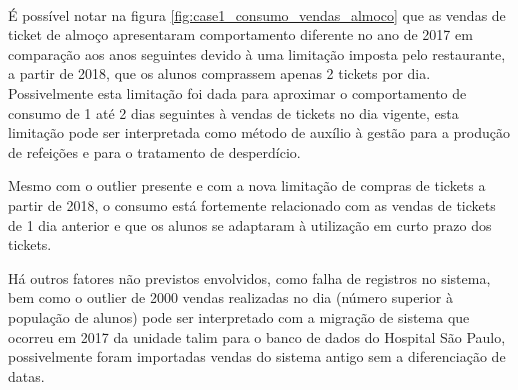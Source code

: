 \documentclass[	12pt, Times, openright, twoside, a4paper, english, brazil]{abntex2}
\begin{document}
        	      \paragraph*{}É possível notar na figura \ref{fig:case1_consumo_vendas_almoco} que as  vendas de ticket de almoço apresentaram comportamento diferente no ano de 2017 em comparação aos anos seguintes devido à uma limitação imposta pelo restaurante, a partir de 2018, que os alunos comprassem apenas 2 tickets por dia. Possivelmente esta limitação foi dada para aproximar o comportamento de consumo de 1 até 2 dias seguintes à vendas de tickets no dia vigente, esta limitação pode ser interpretada como método de auxílio à gestão para a produção de refeições e para o tratamento de desperdício.
        	        
        	        Mesmo com o outlier presente e com a nova limitação de compras de tickets a partir de 2018, o consumo está fortemente relacionado com as vendas de tickets de 1 dia anterior e que os alunos se adaptaram à utilização em curto prazo dos tickets.
        	        
        	        Há outros fatores não previstos envolvidos, como falha de registros no sistema, bem como o outlier de 2000 vendas realizadas no dia (número superior à população de alunos) pode ser interpretado com a migração de sistema que ocorreu em 2017 da unidade talim para o banco de dados do Hospital São Paulo, possivelmente foram importadas vendas do sistema antigo sem a diferenciação de datas.
        	        
\end{document}
